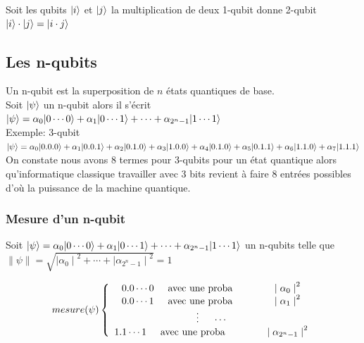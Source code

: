 \documentclass[12pt,openany]{report}
\DeclarePairedDelimiter\ket{\lvert}{\rangle}
\begin{document}
 Soit les qubits $\ket{i}$ et $\ket{j} $ la multiplication de deux 1-qubit donne 2-qubit\\
 $ \ket{i}\cdot \ket{j}=\ket{i\cdot j}  $


\subsection{Les n-qubits}
Un n-qubit est la superposition de $n$ états quantiques de base.\\
Soit $\ket{\psi} $ un n-qubit alors il s'écrit \\
$\ket{\psi}=\alpha_0 \ket{0 \cdots 0}+ \alpha_1 \ket{0 \cdots 1}+ \cdots +\alpha_{2^n -1} \ket{1 \cdots 1}  $\\
Exemple: 3-qubit\\
$\ket{\psi}=\alpha_0 \ket{0.0.0} + \alpha_1 \ket{0.0.1} + \alpha_2 \ket{0.1.0}+ \alpha_3 \ket{1.0.0} + \alpha_4 \ket{0.1.0} + \alpha_5 \ket{0.1.1}+ \alpha_6 \ket{1.1.0}+\alpha_7 \ket{1.1.1} $\\
On constate nous avons 8 termes pour 3-qubits pour un  état quantique alors qu'informatique classique travailler avec 3 bits revient à faire 8 entrées possibles d'où la puissance de la machine quantique.


\subsubsection{Mesure d'un n-qubit}
Soit $\ket{\psi}=\alpha_0 \ket{0 \cdots 0}+ \alpha_1 \ket{0 \cdots 1}+ \cdots +\alpha_{2^n -1} \ket{1 \cdots 1}  $ un n-qubits telle que \\
$\lVert \psi \rVert=\sqrt{{\mid \alpha_0 \mid}^2+ \cdots +{\mid \alpha_{2^n - 1} \mid}^2 }=1 $


\[  
mesure(\psi) \left \{
\begin{array}{ c  c }
0.0\cdots 0 \hspace{0.5cm} \text{avec une proba} \hspace{1.5cm} {\mid \alpha_0 \mid}^2\\
0.0\cdots 1 \hspace{0.5cm} \text{avec une proba} \hspace{1.5cm} {\mid \alpha_1 \mid}^2\\
\vdots \hspace{0.5cm} \cdots \\
1.1\cdots 1   \hspace{0.5cm} \text{avec une proba} \hspace{1.5cm} {\mid \alpha_{2^n -1} \mid}^2\\
  
\end{array}
\right.
\]
\end{document}

